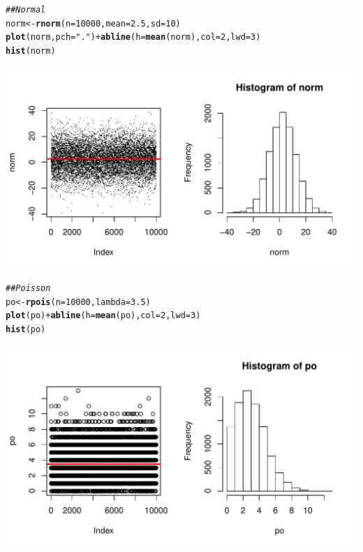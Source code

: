 \documentclass{article}\usepackage[]{graphicx}\usepackage[]{color}
\makeatletter
\newcommand{\hlnum}[1]{\textcolor[rgb]{0.686,0.059,0.569}{#1}}%
\newcommand{\hlstr}[1]{\textcolor[rgb]{0.192,0.494,0.8}{#1}}%
\newcommand{\hlcom}[1]{\textcolor[rgb]{0.678,0.584,0.686}{\textit{#1}}}%
\newcommand{\hlopt}[1]{\textcolor[rgb]{0,0,0}{#1}}%
\newcommand{\hlstd}[1]{\textcolor[rgb]{0.345,0.345,0.345}{#1}}%
\newcommand{\hlkwb}[1]{\textcolor[rgb]{0.69,0.353,0.396}{#1}}%
\newcommand{\hlkwc}[1]{\textcolor[rgb]{0.333,0.667,0.333}{#1}}%
\newcommand{\hlkwd}[1]{\textcolor[rgb]{0.737,0.353,0.396}{\textbf{#1}}}%
\newenvironment{kframe}{%
 \def\at@end@of@kframe{}%
 \ifinner\ifhmode%
  \def\at@end@of@kframe{\end{minipage}}%
  \begin{minipage}{\columnwidth}%
 \fi\fi%
 \def\FrameCommand##1{\hskip\@totalleftmargin \hskip-\fboxsep
 \colorbox{shadecolor}{##1}\hskip-\fboxsep
     \hskip-\linewidth \hskip-\@totalleftmargin \hskip\columnwidth}%
 \MakeFramed {\advance\hsize-\width
   \@totalleftmargin\z@ \linewidth\hsize
   \@setminipage}}%
 {\par\unskip\endMakeFramed%
 \at@end@of@kframe}
\newenvironment{knitrout}{}{} %
\makeatother
\begin{document}
\begin{knitrout}
\begin{kframe}\begin{alltt}
\hlcom{## Normal}
\hlstd{norm} \hlkwb{<-} \hlkwd{rnorm}\hlstd{(}\hlkwc{n} \hlstd{=} \hlnum{10000}\hlstd{,} \hlkwc{mean} \hlstd{=} \hlnum{2.5}\hlstd{,} \hlkwc{sd} \hlstd{=} \hlnum{10}\hlstd{)}
\hlkwd{plot}\hlstd{(norm,} \hlkwc{pch} \hlstd{=} \hlstr{"."}\hlstd{)} \hlopt{+} \hlkwd{abline}\hlstd{(}\hlkwc{h} \hlstd{=} \hlkwd{mean}\hlstd{(norm),} \hlkwc{col} \hlstd{=} \hlnum{2}\hlstd{,} \hlkwc{lwd} \hlstd{=} \hlnum{3}\hlstd{)}
\hlkwd{hist}\hlstd{(norm)}
\end{alltt}
\end{kframe}
\includegraphics[width=.5\linewidth]{figure/RNG3} 
\begin{kframe}\begin{alltt}
\hlcom{## Poisson}
\hlstd{po} \hlkwb{<-} \hlkwd{rpois}\hlstd{(}\hlkwc{n} \hlstd{=} \hlnum{10000}\hlstd{,} \hlkwc{lambda} \hlstd{=} \hlnum{3.5}\hlstd{)}
\hlkwd{plot}\hlstd{(po)} \hlopt{+} \hlkwd{abline}\hlstd{(}\hlkwc{h} \hlstd{=} \hlkwd{mean}\hlstd{(po),} \hlkwc{col} \hlstd{=} \hlnum{2}\hlstd{,} \hlkwc{lwd} \hlstd{=} \hlnum{3}\hlstd{)}
\hlkwd{hist}\hlstd{(po)}
\end{alltt}
\end{kframe}
\includegraphics[width=.5\linewidth]{figure/RNG4} 

\end{knitrout}
\end{document}
